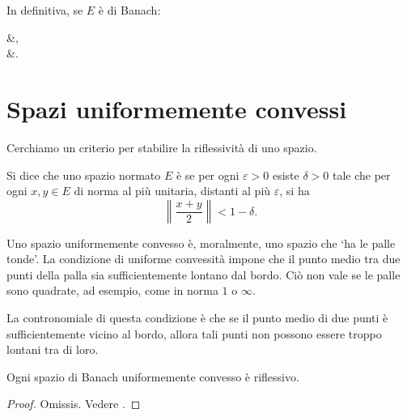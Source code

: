 In definitiva, se $E$ è di Banach:
\begin{eqalign*}
	 &\sse {},\\
	 &\sse {}.
\end{eqalign*}

\section{Spazi uniformemente convessi}
Cerchiamo un criterio per stabilire la riflessività di uno spazio.

\begin{definition}
	Si dice che uno spazio normato $E$ è  se per ogni $\varepsilon > 0$ esiste $\delta > 0$ tale che per ogni $x,y \in E$ di norma al più unitaria, distanti al più $\varepsilon$, si ha
	\begin{equation*}
		\left\|\frac{x+y}2\right\| < 1-\delta.
	\end{equation*}
\end{definition}

Uno spazio uniformemente convesso è, moralmente, uno spazio che `ha le palle tonde'.
La condizione di uniforme convessità impone che il punto medio tra due punti della palla sia sufficientemente lontano dal bordo. Ciò non vale se le palle sono quadrate, ad esempio, come in norma $1$ o $\infty$.

La contronomiale di questa condizione è che se il punto medio di due punti è sufficientemente vicino al bordo, allora tali punti non possono essere troppo lontani tra di loro.

\begin{theorem}[Milman]
\label{th:milman}
	Ogni spazio di Banach uniformemente convesso è riflessivo.
\end{theorem}
\begin{proof}
	Omissis. Vedere \cite{brezis2010functional}.
\end{proof}

